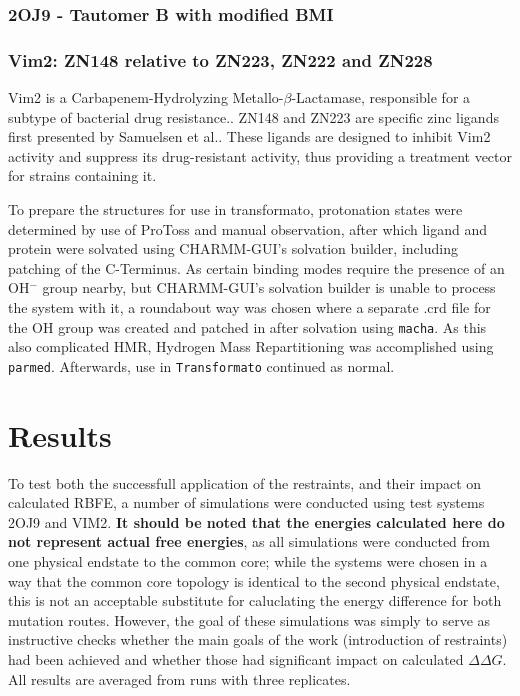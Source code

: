 \documentclass[oneside]{scrreprt}
\begin{document}
\subsection{2OJ9 - Tautomer B with modified BMI}
\subsection{Vim2: ZN148 relative to ZN223, ZN222 and ZN228}
Vim2 is a Carbapenem-Hydrolyzing Metallo-$\beta$-Lactamase, responsible for a subtype of bacterial drug resistance.\cite{Poirel2000Apr}. ZN148 and ZN223 are specific zinc ligands first presented by Samuelsen et al.\cite{Samuelsen2020Jun}. These ligands are designed to inhibit Vim2 activity and suppress its drug-resistant activity, thus providing a treatment vector for strains containing it. 

To prepare the structures for use in transformato, protonation states were determined by use of ProToss\cite{Lippert2009Dec,Bietz2014Dec} and manual observation, after which ligand and protein were solvated using CHARMM-GUI's solvation builder, including patching of the C-Terminus. As certain binding modes require the presence of an OH$^-$ group nearby, but CHARMM-GUI's solvation builder is unable to process the system with it, a roundabout way was chosen where a separate .crd file for the OH group was created and patched in after solvation using \texttt{macha}\cite{twotoneblue2022May}. As this also complicated HMR, Hydrogen Mass Repartitioning was accomplished using \texttt{parmed}\cite{Shirts2016Sep}. Afterwards, use in \texttt{Transformato} continued as normal.



\chapter{Results}
To test both the successfull application of the restraints, and their impact on calculated RBFE, a number of simulations were conducted using test systems 2OJ9 and VIM2. \textbf{It should be noted that the energies calculated here do not represent actual free energies}, as all simulations were conducted from one physical endstate to the common core; while the systems were chosen in a way that the common core topology is identical to the second physical endstate, this is not an acceptable substitute for caluclating the energy difference for both mutation routes. However, the goal of these simulations was simply to serve as instructive checks whether the main goals of the work (introduction of restraints) had been achieved and whether those had significant impact on calculated $ \Delta \Delta G$. All results are averaged from runs with three replicates.
\end{document}
